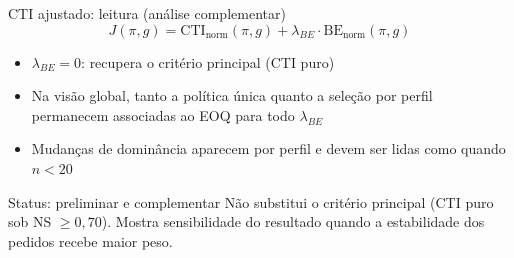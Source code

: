 \begin{frame}{CTI ajustado: leitura (análise complementar)}
  \[
    J(\pi,g) = \mathrm{CTI}_{\text{norm}}(\pi,g) + \lambda_{BE}\cdot \mathrm{BE}_{\text{norm}}(\pi,g)
  \]
  \begin{itemize}
    \small
    \item $\lambda_{BE}=0$: recupera o critério principal (CTI puro)
    \item Na visão global, tanto a política única quanto a seleção por perfil
      permanecem associadas ao EOQ para todo $\lambda_{BE}$
    \item Mudanças de dominância aparecem por perfil e devem ser lidas como
       quando $n<20$
  \end{itemize}
  \vfill
  \begin{alertblock}{Status: preliminar e complementar}
    \footnotesize Não substitui o critério principal (CTI puro sob
    NS $\geq 0{,}70$). Mostra sensibilidade do resultado quando a
    estabilidade dos pedidos recebe maior peso.
  \end{alertblock}
\end{frame}

